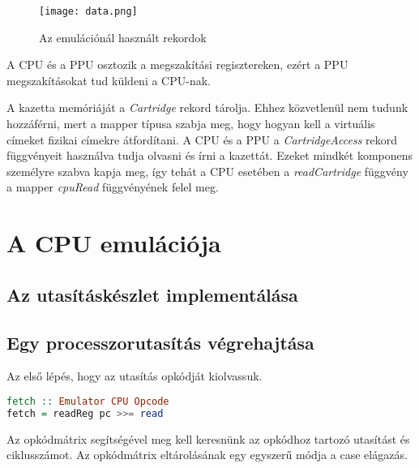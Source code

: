 \begin{figure}[H]
	\centering
	\texttt{[image: data.png]}
	\caption{Az emulációnál használt rekordok}
\end{figure}

A CPU és a PPU osztozik a megszakítási regisztereken, ezért a PPU megszakításokat tud küldeni a CPU-nak.

A kazetta memóriáját a \emph{Cartridge} rekord tárolja. Ehhez közvetlenül nem tudunk hozzáférni, mert a mapper típusa szabja meg, hogy hogyan kell a virtuális címeket fizikai címekre átfordítani. A CPU és a PPU a \emph{CartridgeAccess} rekord függvényeit használva tudja olvasni és írni a kazettát. Ezeket mindkét komponens személyre szabva kapja meg, így tehát a CPU esetében a \emph{readCartridge} függvény a mapper \emph{cpuRead} függvényének felel meg.

\section{A CPU emulációja}

\subsection{Az utasításkészlet implementálása}

\subsection{Egy processzorutasítás végrehajtása}
Az első lépés, hogy az utasítás opkódját kiolvassuk.
\vspace{0.3cm}
\begin{lstlisting}[language=Haskell]
fetch :: Emulator CPU Opcode
fetch = readReg pc >>= read
\end{lstlisting}

Az opkódmátrix segítségével meg kell keresnünk az opkódhoz tartozó utasítást és ciklusszámot. Az opkódmátrix eltárolásának egy egyszerű módja a case elágazás.

